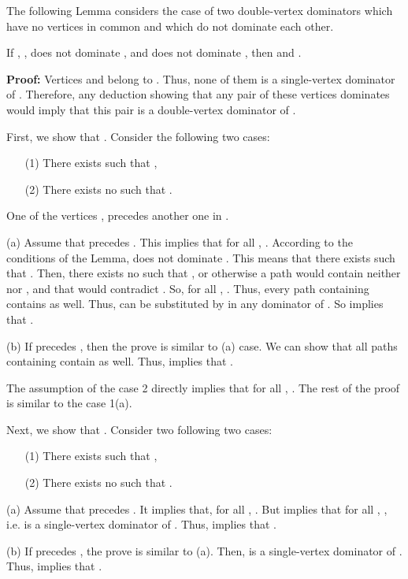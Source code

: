 \documentclass{llncs}
\begin{document}
The following Lemma considers the case of two double-vertex dominators
which have no vertices in common and which do not dominate each other.

\begin{lemma} \label{ddom_p03}
If , ,
 does not dominate , and  does not
dominate , then  and .

\end{lemma}
{\bf Proof:} Vertices  and  belong to . Thus,
 none of them is a single-vertex dominator of
. Therefore, any deduction showing that any pair of these vertices
dominates  would imply that this pair is a double-vertex
dominator of .

First, we show that . 
Consider the following two cases:
\begin{itemize}
\item[(1)] There exists  such that ,
\item[(2)] There exists no  such that .
\end{itemize}

 One of the vertices ,  precedes another one in .

\noindent (a)  Assume that  precedes . This implies that
for all , . According to
the conditions of the Lemma,  does not dominate .
This means that there exists  such that
. Then, there exists no  such that , or otherwise a path  would contain neither  nor
, and that would contradict . 
So, for all , . Thus, every path 
containing  contains  as well. Thus,  can be substituted
by  in any dominator of . So  implies
that .

\noindent (b)  If  precedes , then the prove is similar to
(a) case. We can show that all paths  containing
 contain  as well. Thus,  implies
that .

The assumption of the case 2 directly implies that for all
, . The rest of the proof is
similar to the case 1(a).

Next, we show that . Consider
two following two cases:
\begin{itemize}
\item[(1)] There exists  such that ,
\item[(2)] There exists no  such that .
\end{itemize}

 (a) Assume that  precedes . It
implies that, for all , .  But  implies that for all
, , i.e.   is a single-vertex dominator of
.  Thus,  implies that .

\noindent (b) If  precedes , the prove is similar to (a).
Then,  is a single-vertex dominator of .  Thus,  implies that .
\end{document}
